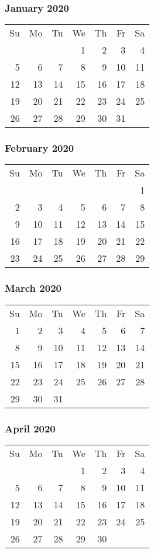 \documentclass[11pt]{article}
\begin{document}
\newcommand{\blankline}{\quad\pagebreak[2]}

\subsubsection*{January 2020}
\begin{tabular}{rrrrrrr}
Su & Mo & Tu & We & Th & Fr & Sa\\
   &    &    &  1 &  2 &  3 &  4\\ 
 5 &  6 &  7 &  8 &  9 & 10 & 11\\ 
12 & 13 & 14 & 15 & 16 & 17 & 18\\ 
19 & 20 & 21 & 22 & 23 & 24 & 25\\ 
26 & 27 & 28 & 29 & 30 & 31 &\\
\end{tabular}

\subsubsection*{February 2020}
\begin{tabular}{rrrrrrr}
Su & Mo & Tu & We & Th & Fr & Sa\\
   &    &    &    &    &    &  1\\ 
 2 &  3 &  4 &  5 &  6 &  7 &  8\\ 
 9 & 10 & 11 & 12 & 13 & 14 & 15\\ 
16 & 17 & 18 & 19 & 20 & 21 & 22\\ 
23 & 24 & 25 & 26 & 27 & 28 & 29\\ 
\end{tabular}

\subsubsection*{March 2020}
\begin{tabular}{rrrrrrr}
Su & Mo & Tu & We & Th & Fr & Sa\\
 1 &  2 &  3 &  4 &  5 &  6 &  7\\ 
 8 &  9 & 10 & 11 & 12 & 13 & 14\\ 
15 & 16 & 17 & 18 & 19 & 20 & 21\\ 
22 & 23 & 24 & 25 & 26 & 27 & 28\\
29 & 30 & 31 &    &    &    & \\
\end{tabular}

\subsubsection*{April 2020}
\begin{tabular}{rrrrrrr}
Su & Mo & Tu & We & Th & Fr & Sa\\
   &    &    &  1 &  2 &  3 &  4\\
 5 &  6 &  7 &  8 &  9 & 10 & 11\\
12 & 13 & 14 & 15 & 16 & 17 & 18\\
19 & 20 & 21 & 22 & 23 & 24 & 25\\ 
26 & 27 & 28 & 29 & 30 &    &\\ 
\end{tabular}
\end{document}
